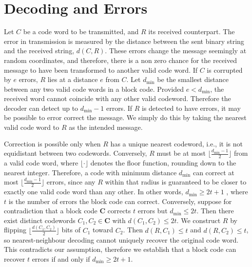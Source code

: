 \documentclass{article}
\begin{document}
\section{Decoding and Errors}
Let \(C\) be a code word to be transmitted, and \(R\) its received counterpart. The error in
transmission is measured by the distance between the sent binary string and the received 
string, \(d(C, R)\). These errors change the message seemingly at random coordinates, and therefore,
there is a non zero chance for the received message to have been transformed to another valid code 
word. If \(C\) is corrupted by \(e\) errors, \(R\) lies at a distance \(e\) from \(C\). Let \(d_\text{min}\)
be the smallest distance between any two valid code words in a block code. Provided \(e < d_\text{min}\),
the received word cannot coincide with any other valid codeword. Therefore the decoder can detect up to 
\(d_\text{min} - 1\) errors. If \(R\) is detected to have errors, it may be possible to error correct the message.
We simply do this by taking the nearest valid code word to \(R\) as the intended message. 


Correction is possible only when \(R\) has a unique nearest codeword, i.e., it is not equidistant between two 
codewords. Conversely, \(R\) must be at most \(\lfloor\frac{d_\text{min} - 1}{2}\rfloor\) from a valid code word,
where \(\lfloor \cdot \rfloor\) denotes the floor function, rounding down to the nearest integer. Therefore,
a code with minimum distance \(d_\text{min}\) can correct at most \(\lfloor\frac{d_\text{min} - 1}{2}\rfloor\)
errors, since any \(R\) within that radius is guaranteed to be closer to exactly one valid code word than any
other. In other words, \(d_\text{min} \geq 2t + 1\) \parencite{bose1960class}, where \(t\) is the number of errors 
the block code can correct.
Conversely, suppose for contradiction that a block code \(\mathbf{C}\) corrects \(t\) errors but \(d_\text{min} 
\leq 2t\). Then there exist distinct codewords \(C_1, C_2 \in \mathbf{C}\) with \(d(C_1, C_2) \leq 2t\). We 
construct \(R\) by flipping \(\lfloor \frac{d(C_1, C_2)}{2} \rfloor\) bits of \(C_1\) toward \(C_2\). Then 
\(d(R, C_1) \leq t\) and \(d(R, C_2) \leq t\), so nearest-neighbour decoding cannot uniquely recover the 
original code word. This contradicts our assumption, therefore we establish that a block code can recover 
\(t\) errors if and only if \(d_\text{min} \geq 2t + 1\).
\end{document}
